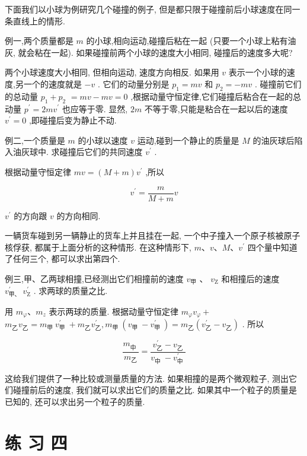\documentclass[10pt]{article}
\begin{document}
下面我们以小球为例研究几个碰撞的例子, 但是都只限于碰撞前后小球速度在同一条直线上的情形.

例一,两个质量都是 \(m\) 的小球,相向运动,碰撞后粘在一起 (只要一个小球上粘有油灰, 就会粘在一起). 如果碰撞前两个小球的速度大小相同, 碰撞后的速度多大呢?

两个小球速度大小相同, 但相向运动, 速度方向相反. 如果用 \(v\) 表示一个小球的速度,另一个的速度就是 \(- v\) . 它们的动量分别是 \({p}_{1} = {mv}\) 和 \({p}_{2} = - {mv}\) . 碰撞前它们的总动量 \({p}_{1} + {p}_{2}\) \(= {mv} - {mv} = 0\) ,根据动量守恒定律,它们碰撞后粘合在一起的总动量 \({p}^{\prime } = {2m}{v}^{\prime }\) 也应等于零. 显然, \({2m}\) 不等于零,只能是粘合在一起以后的速度 \({v}^{\prime } = 0\) ,即碰撞后变为静止不动.

例二,一个质量是 \(m\) 的小球以速度 \(v\) 运动,碰到一个静止的质量是 \(M\) 的油灰球后陷入油灰球中. 求碰撞后它们的共同速度 \({v}^{\prime }\) .

根据动量守恒定律 \({mv} = \left( {M + m}\right) {v}^{\prime }\) ,所以

\[
{v}^{\prime } = \frac{m}{M + m}v
\]

\({v}^{\prime }\) 的方向跟 \(v\) 的方向相同.

一辆货车碰到另一辆静止的货车上并且挂在一起, 一个中子撞入一个原子核被原子核俘获, 都属于上面分析的这种情形. 在这种情形下, \(m\text{、}v\text{、}M\text{、}{v}^{\prime }\) 四个量中知道了任何三个, 都可以求出第四个.

例三,甲、乙两球相撞,已经测出它们相撞前的速度 \({v}_{甲}\) 、 \({v}_{\mathrm{Z}}\) 和相撞后的速度 \({v}_{\text{甲、 }}^{\prime }{v}_{\mathrm{Z}}^{\prime }\) . 求两球的质量之比.

用 \({m}_{\varphi }\text{、}{m}_{z}\) 表示两球的质量. 根据动量守恒定律 \({m}_{\varphi }{v}_{\varphi } +\) \({m}_{乙}{v}_{乙} = {m}_{\text{甲 }}{v}_{\text{甲 }}^{\prime } + {m}_{乙}{v}_{乙}^{\prime },{m}_{\text{甲 }}\left( {{v}_{\text{甲 }} - {v}_{\text{甲 }}^{\prime }}\right) = {m}_{乙}\left( {{v}_{乙}^{\prime } - {v}_{乙}}\right)\) . 所以

\[
\frac{{m}_{\text{中 }}}{{m}_{乙}} = \frac{{v}_{乙}^{\prime } - {v}_{乙}}{{v}_{\text{中 }} - {v}_{\text{中 }}^{\prime }}
\]

这给我们提供了一种比较或测量质量的方法. 如果相撞的是两个微观粒子, 测出它们碰撞前后的速度, 我们就可以求出它们的质量之比. 如果其中一个粒子的质量是已知的, 还可以求出另一个粒子的质量.

\section*{练 习 四}
\end{document}

